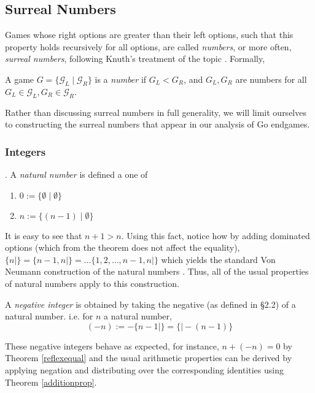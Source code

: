 \documentclass[../math194_paper.tex]{subfiles}
\begin{document}
\subsection{Surreal Numbers}

Games whose right options are greater than their left options, such that this property holds recursively
for all options, are called \textit{numbers}, or more often, \textit{surreal numbers}, following
Knuth's treatment of the topic \cite{knuth1974surreal}. Formally,
\begin{definition}[Number]
    A game $G = \{\mathcal{G}_L \mid \mathcal{G}_R \}$ is a \textit{number}
    if $G_L < G_R$, and $G_L, G_R$ are numbers for all $G_L \in \mathcal{G}_L, G_R \in \mathcal{G}_R$.
\end{definition}
Rather than discussing surreal numbers in full generality, we will limit ourselves 
to constructing the surreal numbers that appear in our analysis of Go endgames.

\subsubsection{Integers} 
\begin{definition}. A \textit{natural number} is defined a one of
\begin{enumerate}
    \item  $0 := \{ \emptyset \mid \emptyset \}$
    \item  $n := \{ (n-1) \mid \emptyset \}$
\end{enumerate}
\end{definition}
It is easy to see that $n+1 > n$.
Using this fact, notice how by adding dominated options (which from the theorem does not affect the equality), 
$\{ n\mid \} = \{ n-1, n \mid \} = \ldots \{ 1, 2, \ldots, n-1, n\mid \}$ which
yields the standard Von Neumann construction of the natural numbers \cite[\S 4]{enderton1977elements}
\cite[\S 2]{schleicher2006introduction}. 
Thus, all of the usual properties of natural numbers apply to this construction.

\begin{definition} A \textit{negative integer} is obtained by taking the 
negative (as defined in \S 2.2) of a natural number. i.e. for $n$ a natural number,
\[ (-n) := - \{n-1 \mid \} = \{ \mid -(n-1)\} \]
\end{definition}
These negative integers behave as expected, for instance, $n + (-n) = 0$ by Theorem \ref{reflexequal}
and the usual arithmetic properties can be derived by applying negation and distributing over the
corresponding identities using Theorem \ref{additionprop}. \\
\end{document}
